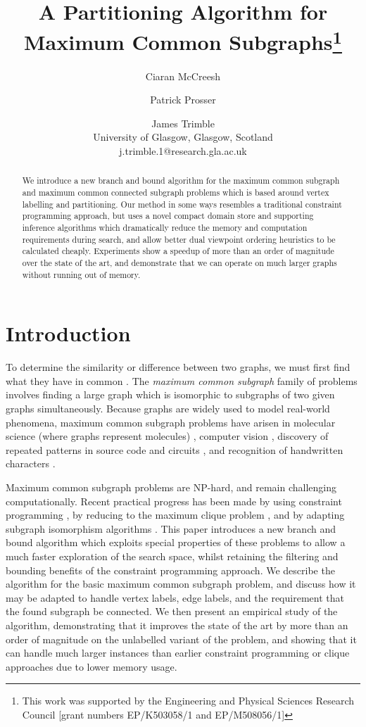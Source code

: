 \documentclass[letterpaper]{article}
\title{A Partitioning Algorithm for Maximum Common Subgraphs\thanks{This work
was supported by the Engineering and Physical Sciences Research Council [grant
numbers EP/K503058/1 and EP/M508056/1]}}
\author{Ciaran McCreesh \and Patrick Prosser \and James Trimble \\
University of Glasgow, Glasgow, Scotland \\
j.trimble.1@research.gla.ac.uk}
\newcommand{\citep}[1]{\cite{#1}}
\begin{document}
\maketitle

\begin{abstract}
    We introduce a new branch and bound algorithm for the maximum common
    subgraph and maximum common connected subgraph problems which is based
    around vertex labelling and partitioning. Our method in some ways resembles
    a traditional constraint programming approach, but uses a novel compact
    domain store and supporting inference algorithms which dramatically reduce
    the memory and computation requirements during search, and allow better
    dual viewpoint ordering heuristics to be calculated cheaply.  Experiments
    show a speedup of more than an order of magnitude over the state of the
    art, and demonstrate that we can operate on much larger graphs without
    running out of memory.
\end{abstract}

\section{Introduction}

To determine the similarity or difference between two graphs, we must first
find what they have in common
\citep{DBLP:journals/prl/Bunke97,DBLP:journals/prl/FernandezV01,KriegeThesis}.
The \emph{maximum common subgraph} family of problems involves finding a large
graph which is isomorphic to subgraphs of two given graphs simultaneously.
Because graphs are widely used to model real-world phenomena, maximum common
subgraph problems have arisen in molecular science (where graphs represent
molecules)
\citep{DBLP:journals/jcamd/RaymondW02a,Ehrlich:2011,DAM2014,Grindley1993707},
computer vision \cite{DBLP:journals/jair/CookH94}, discovery of repeated
patterns in source code \cite{DBLP:journals/tkde/DjokoCH97} and circuits
\cite{DBLP:journals/jair/CookH94}, and recognition of handwritten characters
\cite{SIWEILU1991617}.

Maximum common subgraph problems are NP-hard, and remain challenging
computationally. Recent practical progress has been made by using constraint
programming \citep{DBLP:conf/cp/NdiayeS11,DBLP:conf/cp/McCreeshNPS16}, by
reducing to the maximum clique problem
\citep{LeviG,DBLP:conf/cp/McCreeshNPS16}, and by adapting subgraph isomorphism
algorithms \citep{UpcomingAAAIPaper}. This paper introduces a new branch and
bound algorithm which exploits special properties of these problems to allow a
much faster exploration of the search space, whilst retaining the filtering and
bounding benefits of the constraint programming approach. We describe the
algorithm for the basic maximum common subgraph problem, and discuss how it may
be adapted to handle vertex labels, edge labels, and the requirement that the
found subgraph be connected. We then present an empirical study of the
algorithm, demonstrating that it improves the state of the art by more than an
order of magnitude on the unlabelled variant of the problem, and showing that
it can handle much larger instances than earlier constraint programming or
clique approaches due to lower memory usage.
\end{document}
